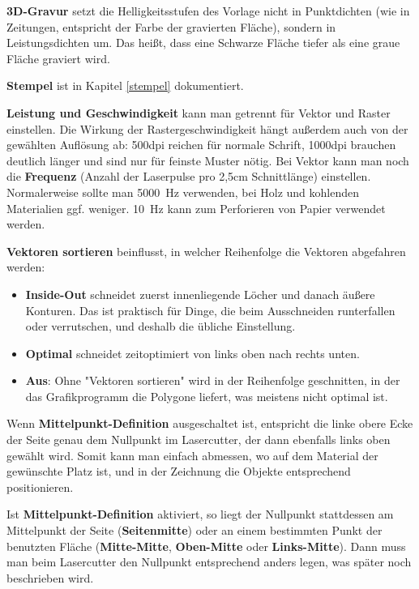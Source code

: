 \documentclass{\basedir/fablab-document}
\begin{document}
\textbf{3D-Gravur} setzt die Helligkeitsstufen des Vorlage nicht in Punktdichten (wie in Zeitungen, entspricht der Farbe der gravierten Fläche), sondern in Leistungsdichten um. Das heißt, dass eine Schwarze Fläche tiefer als eine graue Fläche graviert wird.

\textbf{Stempel} ist in Kapitel \ref{stempel} dokumentiert.

\textbf{Leistung und Geschwindigkeit} kann man getrennt für Vektor und Raster einstellen. Die Wirkung der Rastergeschwindigkeit hängt außerdem auch von der gewählten Auflösung ab: 500dpi reichen für normale Schrift, 1000dpi brauchen deutlich länger und sind nur für feinste Muster nötig. Bei Vektor kann man noch die \textbf{Frequenz} (Anzahl der Laserpulse pro 2,5cm Schnittlänge) einstellen. Normalerweise sollte man 5000~Hz verwenden, bei Holz und kohlenden Materialien ggf. weniger. 10~Hz kann zum Perforieren von Papier verwendet werden. %

\textbf{Vektoren sortieren} beinflusst, in welcher Reihenfolge die Vektoren abgefahren werden:
\begin{itemize}
 \item \textbf{Inside-Out} schneidet zuerst innenliegende Löcher und danach äußere Konturen.  Das ist praktisch für Dinge, die beim Ausschneiden runterfallen oder verrutschen, und deshalb die übliche Einstellung.
 \item \textbf{Optimal} schneidet zeitoptimiert von links oben nach rechts unten.
 \item \textbf{Aus}: Ohne "Vektoren sortieren" wird in der Reihenfolge geschnitten, in der das Grafikprogramm die Polygone liefert, was meistens nicht optimal ist.
\end{itemize}


Wenn \textbf{Mittelpunkt-Definition} ausgeschaltet ist, entspricht die linke obere Ecke der Seite genau dem Nullpunkt im Lasercutter, der dann ebenfalls links oben gewählt wird. Somit kann man einfach abmessen, wo auf dem Material der gewünschte Platz ist, und in der Zeichnung die Objekte entsprechend positionieren.

Ist \textbf{Mittelpunkt-Definition} aktiviert, so liegt der Nullpunkt stattdessen am Mittelpunkt der Seite (\textbf{Seiten\-mitte}) oder an einem bestimmten Punkt der benutzten Fläche (\textbf{Mitte-Mitte}, \textbf{Oben-Mitte} oder \textbf{Links-Mitte}). Dann muss man beim Lasercutter den Nullpunkt entsprechend anders legen, was später noch beschrieben wird.
\end{document}
